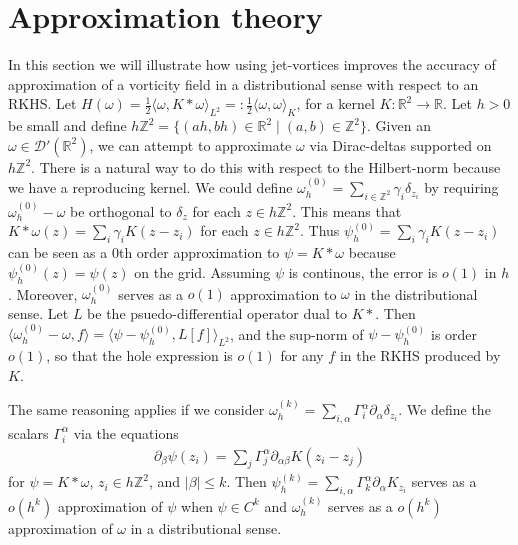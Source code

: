 \documentclass[12pt]{amsart}
\newcommand{\R}{\ensuremath{\mathbb{R}}}
\begin{document}
\section{Approximation theory}
\label{sec:approximation}
In this section we will illustrate how using jet-vortices improves the accuracy of approximation of a vorticity field in a distributional sense
with respect to an RKHS.  Let $H(\omega) = \frac{1}{2} \langle \omega , K*\omega\rangle_{L^2} =: \frac{1}{2} \langle \omega , \omega \rangle_K$, for a kernel $K:\R^2 \to \R$.
Let $h > 0$ be small and define $h \mathbb{Z}^2 = \{ (ah,bh) \in \R^2 \mid (a,b) \in \mathbb{Z}^2 \}$.
Given an $\omega \in \mathcal{D}'(\R^2)$, we can attempt to approximate $\omega$ via Dirac-deltas supported on $h \mathbb{Z}^2$.
There is a natural way to do this with respect to the Hilbert-norm because we have a reproducing kernel.
We could define $\omega_h^{(0)} = \sum_{i \in \mathbb{Z}^2} \gamma_i \delta_{z_i}$ by requiring $\omega_h^{(0)} - \omega$ be orthogonal to $\delta_z$ for each $z \in h \mathbb{Z}^2$.
This means that $K*\omega(z) =  \sum_i \gamma_i K(z-z_i)$ for each $z \in h\mathbb{Z}^2$.
Thus $\psi_h^{(0)} = \sum_i \gamma_i K(z-z_i)$ can be seen as a $0$th order approximation to $\psi = K*\omega$
because $\psi_h^{(0)}(z) = \psi(z)$ on the grid.
Assuming $\psi$ is continous, the error is $o(1)$ in $h$.
Moreover, $\omega^{(0)}_h$ serves as a $o(1)$ approximation to $\omega$ in the distributional sense.
Let $L$ be the psuedo-differential operator dual to $K*$.
Then $\langle \omega^{(0)}_h - \omega , f \rangle = \langle \psi - \psi_h^{(0)} , L[f] \rangle_{L^2}$,
and the sup-norm of $\psi-\psi_h^{(0)}$ is order $o(1)$, so that the hole expression is $o(1)$
for any $f$ in the RKHS produced by $K$.
 
The same reasoning applies if we consider $\omega^{(k)}_h = \sum_{i,\alpha} \Gamma_i^\alpha \partial_\alpha \delta_{z_i}$.
We define the scalars $\Gamma_i^\alpha$ via the equations
\begin{align*}
  \partial_\beta \psi (z_i) = \sum_j \Gamma_j^\alpha \partial_{\alpha\beta} K(z_i - z_j)
\end{align*}
for $\psi = K*\omega$, $z_i \in h \mathbb{Z}^2$, and $|\beta| \leq k$.
Then $\psi^{(k)}_h = \sum_{i,\alpha}\Gamma_k^\alpha \partial_\alpha K_{z_i}$
serves as a $o(h^{k})$ approximation of $\psi$ when $\psi \in C^k$
and $\omega^{(k)}_h$ serves as a $o(h^k)$ approximation of $\omega$ in
a distributional sense.
\end{document}
